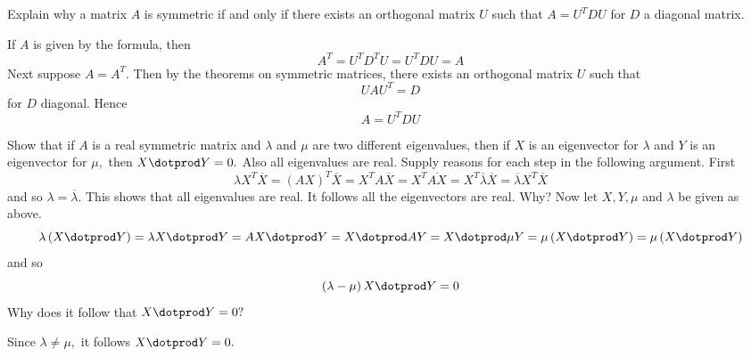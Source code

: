 \begin{enumialphparenastyle}
\begin{ex} Explain why a matrix $A$ is symmetric if and only if there exists an
orthogonal matrix $U$ such that $A=U^{T}DU$ for $D$ a diagonal matrix.
\begin{sol}
If $A$ is given by the formula, then
\[
A^{T}=U^{T}D^{T}U=U^{T}DU=A
\]
Next suppose $A=A^{T}.$ Then by the theorems on symmetric matrices, there
exists an orthogonal matrix $U$ such that
\[
UAU^{T}=D
\]
for $D$ diagonal. Hence
\[
A=U^{T}DU
\]
\end{sol}
\end{ex}

\begin{ex} Show that if $A$ is a real symmetric matrix and 
$\lambda $ and $\mu $ are two different eigenvalues, then if $X$ is
an eigenvector for $\lambda $ and $Y$ is an eigenvector for $\mu ,$
then $X\dotprod Y=0.$ Also all eigenvalues are real. Supply reasons
for each step in the following argument. First 
\begin{equation*}
\lambda X^{T}\overline{X}=\left( AX\right) ^{T}
\overline{X}=X^{T}A\overline{X}=X^{T}
\overline{AX}=X^{T}\overline{\lambda }\overline{X}
=\overline{\lambda }X^{T}\overline{X}
\end{equation*}
and so $\lambda =\overline{\lambda }.$ This shows that all eigenvalues are
real. It follows all the eigenvectors are real. Why? Now let $X,Y
,\mu $ and $\lambda $ be given as above. \ 
\begin{equation*}
\lambda \left( X\dotprod Y\right) =\lambda X\dotprod Y=AX\dotprod Y=X\dotprod AY=X\dotprod \mu Y=\mu \left( 
X\dotprod Y\right) =\mu \left( X\dotprod Y\right)
\end{equation*}
and so 
\begin{equation*}
\left( \lambda -\mu \right) X\dotprod Y=0
\end{equation*}
Why does it follow that $X\dotprod Y=0?$
\begin{sol}
Since $\lambda \neq \mu ,$ it follows $X \dotprod Y =0.$
\end{sol}
\end{ex}

\end{enumialphparenastyle}